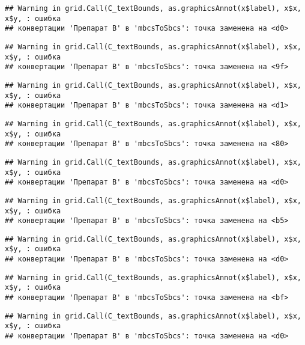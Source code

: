 \documentclass[
]{article}
\begin{document}
\begin{verbatim}
## Warning in grid.Call(C_textBounds, as.graphicsAnnot(x$label), x$x, x$y, : ошибка
## конвертации 'Препарат B' в 'mbcsToSbcs': точка заменена на <d0>
\end{verbatim}

\begin{verbatim}
## Warning in grid.Call(C_textBounds, as.graphicsAnnot(x$label), x$x, x$y, : ошибка
## конвертации 'Препарат B' в 'mbcsToSbcs': точка заменена на <9f>
\end{verbatim}

\begin{verbatim}
## Warning in grid.Call(C_textBounds, as.graphicsAnnot(x$label), x$x, x$y, : ошибка
## конвертации 'Препарат B' в 'mbcsToSbcs': точка заменена на <d1>
\end{verbatim}

\begin{verbatim}
## Warning in grid.Call(C_textBounds, as.graphicsAnnot(x$label), x$x, x$y, : ошибка
## конвертации 'Препарат B' в 'mbcsToSbcs': точка заменена на <80>
\end{verbatim}

\begin{verbatim}
## Warning in grid.Call(C_textBounds, as.graphicsAnnot(x$label), x$x, x$y, : ошибка
## конвертации 'Препарат B' в 'mbcsToSbcs': точка заменена на <d0>
\end{verbatim}

\begin{verbatim}
## Warning in grid.Call(C_textBounds, as.graphicsAnnot(x$label), x$x, x$y, : ошибка
## конвертации 'Препарат B' в 'mbcsToSbcs': точка заменена на <b5>
\end{verbatim}

\begin{verbatim}
## Warning in grid.Call(C_textBounds, as.graphicsAnnot(x$label), x$x, x$y, : ошибка
## конвертации 'Препарат B' в 'mbcsToSbcs': точка заменена на <d0>
\end{verbatim}

\begin{verbatim}
## Warning in grid.Call(C_textBounds, as.graphicsAnnot(x$label), x$x, x$y, : ошибка
## конвертации 'Препарат B' в 'mbcsToSbcs': точка заменена на <bf>
\end{verbatim}

\begin{verbatim}
## Warning in grid.Call(C_textBounds, as.graphicsAnnot(x$label), x$x, x$y, : ошибка
## конвертации 'Препарат B' в 'mbcsToSbcs': точка заменена на <d0>
\end{verbatim}
\end{document}
